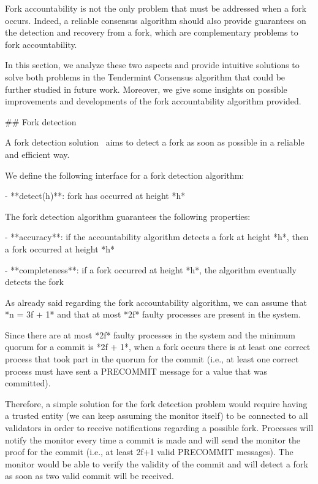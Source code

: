 \documentclass[a4paper,11pt,oneside]{report}
\begin{document}
\begin{markdown}

Fork accountability is not the only problem that must be addressed when a fork occurs. Indeed, a reliable consensus algorithm should also provide guarantees on the detection and recovery from a fork, which are complementary problems to fork accountability. 

In this section, we analyze these two aspects and provide intuitive solutions to solve both problems in the Tendermint Consensus algorithm that could be further studied in future work. Moreover, we give some insights on possible improvements and developments of the fork accountability algorithm provided.

## Fork detection

A fork detection solution~\cite{failure-detection} aims to detect a fork as soon as possible in a reliable and efficient way.

We define the following interface for a fork detection algorithm:

- **detect(h)**: fork has occurred at height *h*

The fork detection algorithm guarantees the following properties:

- **accuracy**: if the accountability algorithm detects a fork at height *h*, then a fork occurred at height *h*

- **completeness**: if a fork occurred at height *h*, the algorithm eventually detects the fork

As already said regarding the fork accountability algorithm, we can assume that *n = 3f + 1* and that at most *2f* faulty processes are present in the system.

Since there are at most *2f* faulty processes in the system and the minimum quorum for a commit is *2f + 1*, when a fork occurs there is at least one correct process that took part in the quorum for the commit (i.e., at least one correct process must have sent a PRECOMMIT message for a value that was committed).

Therefore, a simple solution for the fork detection problem would require having a trusted entity (we can keep assuming the monitor itself) to be connected to all validators in order to receive notifications regarding a possible fork.
Processes will notify the monitor every time a commit is made and will send the monitor the proof for the commit (i.e., at least 2f+1 valid PRECOMMIT messages). The monitor would be able to verify the validity of the commit and will detect a fork as soon as two valid commit will be received.


\end{markdown}
\end{document}
